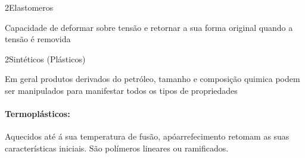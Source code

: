 \documentclass[\mainfilename]{subfiles}
\begin{document}
\begin{sectionBox}2{\color{Graph32}Elastomeros} %
    
    Capacidade de deformar sobre tensão e retornar a sua forma original quando a tensão é removida
    
\end{sectionBox}

\begin{sectionBox}2{\color{Graph33}Sintéticos (Plásticos)} %
    
    Em geral produtos derivados do petróleo, tamanho e composição quimica podem ser manipulados para manifestar todos os tipos de propriedades

    \begin{center}
    \end{center}
    \paragraph*{\color{Graph21}Termoplásticos:}
    Aquecidos até á sua temperatura de fusão, apóarrefecimento retomam as suas características
iniciais. São polímeros lineares ou ramificados.
\end{sectionBox}
\end{document}
